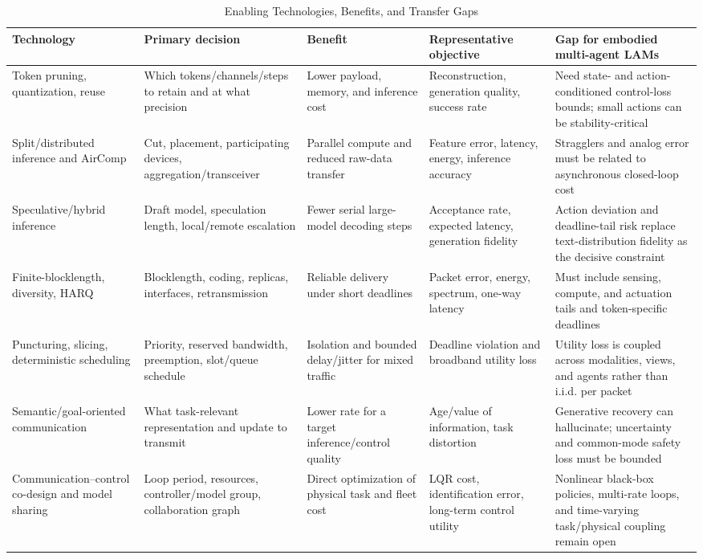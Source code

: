 \documentclass[letterpaper,journal]{IEEEtran}
\begin{document}
\begin{table}[t]
\caption{Enabling Technologies, Benefits, and Transfer Gaps}
\label{tab:enablers}
\centering
\footnotesize
\renewcommand{\arraystretch}{1.17}
\setlength{\tabcolsep}{3.1pt}
\begin{tabular}{|p{}|p{}|p{}|p{}|p{}|}
\hline
\textbf{Technology} & \textbf{Primary decision} & \textbf{Benefit}
& \textbf{Representative objective} & \textbf{Gap for embodied multi-agent
LAMs} \\ \hline
Token pruning, quantization, reuse &
Which tokens/channels/steps to retain and at what precision &
Lower payload, memory, and inference cost &
Reconstruction, generation quality, success rate &
Need state- and action-conditioned control-loss bounds; small actions can be
stability-critical \\ \hline
Split/distributed inference and AirComp &
Cut, placement, participating devices, aggregation/transceiver &
Parallel compute and reduced raw-data transfer &
Feature error, latency, energy, inference accuracy &
Stragglers and analog error must be related to asynchronous closed-loop cost
\\ \hline
Speculative/hybrid inference &
Draft model, speculation length, local/remote escalation &
Fewer serial large-model decoding steps &
Acceptance rate, expected latency, generation fidelity &
Action deviation and deadline-tail risk replace text-distribution fidelity
as the decisive constraint \\ \hline
Finite-blocklength, diversity, HARQ &
Blocklength, coding, replicas, interfaces, retransmission &
Reliable delivery under short deadlines &
Packet error, energy, spectrum, one-way latency &
Must include sensing, compute, and actuation tails and token-specific
deadlines \\ \hline
Puncturing, slicing, deterministic scheduling &
Priority, reserved bandwidth, preemption, slot/queue schedule &
Isolation and bounded delay/jitter for mixed traffic &
Deadline violation and broadband utility loss &
Utility loss is coupled across modalities, views, and agents rather than
i.i.d. per packet \\ \hline
Semantic/goal-oriented communication &
What task-relevant representation and update to transmit &
Lower rate for a target inference/control quality &
Age/value of information, task distortion &
Generative recovery can hallucinate; uncertainty and common-mode safety loss
must be bounded \\ \hline
Communication--control co-design and model sharing &
Loop period, resources, controller/model group, collaboration graph &
Direct optimization of physical task and fleet cost &
LQR cost, identification error, long-term control utility &
Nonlinear black-box policies, multi-rate loops, and time-varying
task/physical coupling remain open \\ \hline
\end{tabular}
\end{table}
\end{document}
